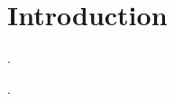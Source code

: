 \section{Introduction}

\lipsum[1-3]

\lipsum[4-6] \cite{author2023, another2022, reference2023}.

\lipsum[7-9] \cite{example2023, sample2022}.

\lipsum[10-12]